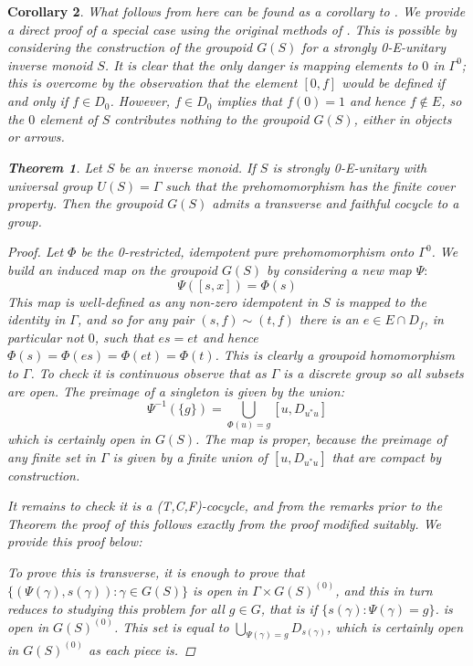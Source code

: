 \documentclass[11pt]{amsart}
\theoremstyle{plain}
\newtheorem{theorem}{Theorem}%
\newtheorem{corollary}[theorem]{Corollary}%
\theoremstyle{definition}%
\theoremstyle{remark}%
\newcommand{\E}{\widehat{E}}
\begin{document}
\begin{corollary}
What follows from here can be found as a corollary to \cite[Theorem 6.14]{Milan-Steinberg}. We provide a direct proof of a special case using the original methods of \cite{MR1900993}. This is possible by considering the construction of the groupoid $G(S)$ for a strongly 0-E-unitary inverse monoid $S$. It is clear that the only danger is mapping elements to $0$ in $\Gamma^{0}$; this is overcome by the observation that the element $[0,f]$ would be defined if and only if $f \in D_{0}$. However, $f \in D_{0}$ implies that $f(0)=1$ and hence $f \not\in \E$, so the $0$ element of $S$ contributes nothing to the groupoid $G(S)$, either in objects or arrows.

\begin{theorem}
Let $S$ be an inverse monoid. If $S$ is strongly 0-E-unitary with universal group $U(S)=\Gamma$ such that the prehomomorphism has the finite cover property. Then the groupoid $G(S)$ admits a transverse and faithful cocycle to a group.
\end{theorem}
\begin{proof}
Let $\Phi$ be the 0-restricted, idempotent pure prehomomorphism onto $\Gamma^{0}$. We build an induced map on the groupoid $G(S)$ by considering a new map $\Psi:$
\begin{equation*}
\Psi([s,x])=\Phi(s)
\end{equation*}
This map is well-defined as any non-zero idempotent in $S$ is mapped to the identity in $\Gamma$, and so for any pair $(s,f) \sim (t,f)$ there is an $e \in E \cap D_{f}$, in particular not $0$, such that $es=et$ and hence $\Phi(s)=\Phi(es)=\Phi(et)=\Phi(t)$. This is clearly a groupoid homomorphism to $\Gamma$. To check it is continuous observe that as $\Gamma$ is a discrete group so all subsets are open. The preimage of a singleton is given by the union:
\begin{equation*}
\Psi^{-1}(\lbrace g \rbrace)=\bigcup_{\Phi(u)=g}[u,D_{u^{*}u}] 
\end{equation*}
which is certainly open in $G(S)$. The map is proper, because the preimage of any finite set in $\Gamma$ is given by a finite union of $[u,D_{u^{*}u}]$ that are compact by construction.

It remains to check it is a (T,C,F)-cocycle, and from the remarks prior to the Theorem the proof of this follows exactly from the proof \cite[Proposition 3.6]{MR1900993} modified suitably. We provide this proof below:

To prove this is transverse, it is enough to prove that $\lbrace (\Psi(\gamma),s(\gamma)):\gamma \in G(S)\rbrace$ is open in $\Gamma \times G(S)^{(0)}$, and this in turn reduces to studying this problem for all $g \in G$, that is if $\lbrace s(\gamma) :\Psi(\gamma)=g \rbrace$. is open in $G(S)^{(0)}$. This set is equal to $\bigcup_{\Psi(\gamma)=g}D_{s(\gamma)}$, which is certainly open in $G(S)^{(0)}$ as each piece is.


\end{proof}
\end{corollary}
\end{document}
